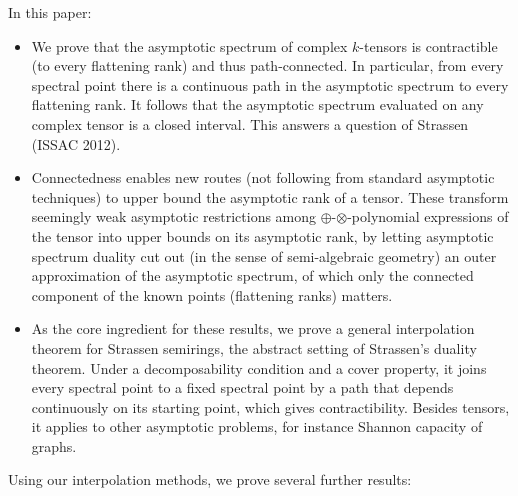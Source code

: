 \documentclass[11pt,letterpaper]{article}
\begin{document}
In this paper:
\begin{itemize}
\item We prove that the asymptotic spectrum of complex \(k\)-tensors is contractible (to every flattening rank) and thus path-connected. In particular, from every spectral point there is a continuous path in the asymptotic spectrum to every flattening rank. It follows that the asymptotic spectrum evaluated on any complex tensor is a closed interval. This answers a question of Strassen (ISSAC 2012). \item Connectedness enables new routes (not following from standard asymptotic techniques) to upper bound the asymptotic rank of a tensor. These transform seemingly weak asymptotic restrictions among $\oplus$-$\otimes$-polynomial expressions of the tensor into upper bounds on its asymptotic rank, by letting asymptotic spectrum duality cut out (in the sense of semi-algebraic geometry) an outer approximation of the asymptotic spectrum, of which only the connected component of the known points (flattening ranks) matters. \item As the core ingredient for these results, we prove a general interpolation theorem for Strassen semirings, the abstract setting of Strassen's duality theorem. Under a decomposability condition and a cover property, it joins every spectral point to a fixed spectral point by a path that depends continuously on its starting point, which gives contractibility. 
Besides tensors, it applies to other asymptotic problems, for instance Shannon capacity of graphs. \end{itemize}
Using our interpolation methods, we prove several further results:
\end{document}
